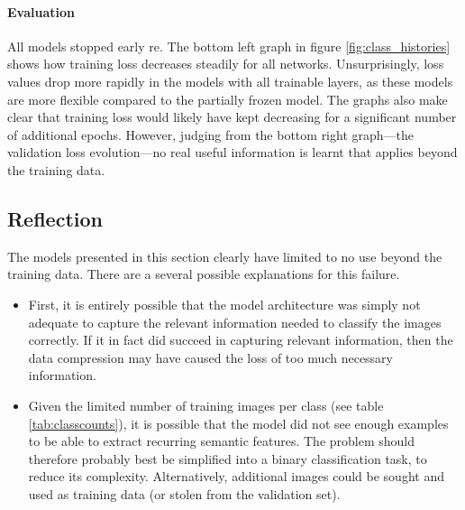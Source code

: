 \paragraph{Evaluation}
All models stopped early re. The bottom left graph in figure \ref{fig:class_histories} shows how training loss decreases steadily for all networks. Unsurprisingly, loss values drop more rapidly in the models with all trainable layers, as these models are more flexible compared to the partially frozen model. The graphs also make clear that training loss would likely have kept decreasing for a significant number of additional epochs. However, judging from the bottom right graph---the validation loss evolution---no real useful information is learnt that applies beyond the training data. 


\subsection{Reflection}
The models presented in this section clearly have limited to no use beyond the training data. There are a several possible explanations for this failure.

\begin{itemize}

	\item{First, it is entirely possible that the model architecture was simply not adequate to capture the relevant information needed to classify the images correctly. If it in fact did succeed in capturing relevant information, then the data compression may have caused the loss of too much necessary information.}
	
	\item{Given the limited number of training images per class (see table \ref{tab:classcounts}), it is possible that the model did not see enough examples to be able to extract recurring semantic features. The problem should therefore probably best be simplified into a binary classification task, to reduce its complexity. Alternatively, additional images could be sought and used as training data (or stolen from the validation set).}

\end{itemize}
